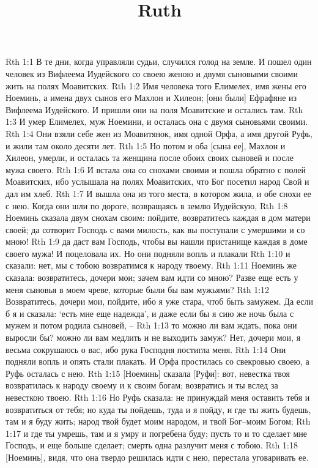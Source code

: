 

\title{Ruth}

Rth 1:1  В те дни, когда управляли судьи, случился голод на земле. И пошел один человек из Вифлеема Иудейского со своею женою и двумя сыновьями своими жить на полях Моавитских.
Rth 1:2  Имя человека того Елимелех, имя жены его Ноеминь, а имена двух сынов его Махлон и Хилеон; [они были] Ефрафяне из Вифлеема Иудейского. И пришли они на поля Моавитские и остались там.
Rth 1:3  И умер Елимелех, муж Ноемини, и осталась она с двумя сыновьями своими.
Rth 1:4  Они взяли себе жен из Моавитянок, имя одной Орфа, а имя другой Руфь, и жили там около десяти лет.
Rth 1:5  Но потом и оба [сына ее], Махлон и Хилеон, умерли, и осталась та женщина после обоих своих сыновей и после мужа своего.
Rth 1:6  И встала она со снохами своими и пошла обратно с полей Моавитских, ибо услышала на полях Моавитских, что Бог посетил народ Свой и дал им хлеб.
Rth 1:7  И вышла она из того места, в котором жила, и обе снохи ее с нею. Когда они шли по дороге, возвращаясь в землю Иудейскую,
Rth 1:8  Ноеминь сказала двум снохам своим: пойдите, возвратитесь каждая в дом матери своей; да сотворит Господь с вами милость, как вы поступали с умершими и со мною!
Rth 1:9  да даст вам Господь, чтобы вы нашли пристанище каждая в доме своего мужа! И поцеловала их. Но они подняли вопль и плакали
Rth 1:10  и сказали: нет, мы с тобою возвратимся к народу твоему.
Rth 1:11  Ноеминь же сказала: возвратитесь, дочери мои; зачем вам идти со мною? Разве еще есть у меня сыновья в моем чреве, которые были бы вам мужьями?
Rth 1:12  Возвратитесь, дочери мои, пойдите, ибо я уже стара, чтоб быть замужем. Да если б я и сказала: `есть мне еще надежда', и даже если бы я сию же ночь была с мужем и потом родила сыновей, --
Rth 1:13  то можно ли вам ждать, пока они выросли бы? можно ли вам медлить и не выходить замуж? Нет, дочери мои, я весьма сокрушаюсь о вас, ибо рука Господня постигла меня.
Rth 1:14  Они подняли вопль и опять стали плакать. И Орфа простилась со свекровью своею, а Руфь осталась с нею.
Rth 1:15  [Ноеминь] сказала [Руфи]: вот, невестка твоя возвратилась к народу своему и к своим богам; возвратись и ты вслед за невесткою твоею.
Rth 1:16  Но Руфь сказала: не принуждай меня оставить тебя и возвратиться от тебя; но куда ты пойдешь, туда и я пойду, и где ты жить будешь, там и я буду жить; народ твой будет моим народом, и твой Бог--моим Богом;
Rth 1:17  и где ты умрешь, там и я умру и погребена буду; пусть то и то сделает мне Господь, и еще больше сделает; смерть одна разлучит меня с тобою.
Rth 1:18  [Ноеминь], видя, что она твердо решилась идти с нею, перестала уговаривать ее.
